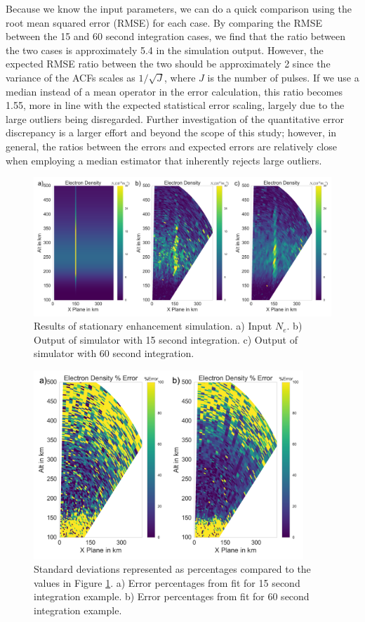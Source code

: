 \documentclass[draft,ras]{agutex}
\begin{document}
\begin{article}
Because we know the input parameters, we can do a quick comparison using the root mean squared error (RMSE) for each case. By comparing the RMSE between the 15 and 60 second integration cases, we find that the ratio between the two cases is approximately 5.4 in the simulation output.  However, the expected RMSE ratio between the two should be approximately 2 since the variance of the ACFs scales as $1/\sqrt{J}$, where $J$ is the number of pulses. If we use a median instead of a mean operator in the error calculation, this ratio becomes 1.55, more in line with the expected statistical error scaling, largely due to the large outliers being disregarded.  Further investigation of the quantitative error discrepancy is a larger effort and beyond the scope of this study; however, in general, the ratios between the errors and expected errors are relatively close when employing a median estimator that inherently rejects large outliers.

\begin{figure}[!t]
\centering
\includegraphics[width=6in]{stationary}
\caption{Results of stationary enhancement simulation. a) Input $N_e$. b) Output of simulator with 15 second integration. c) Output of simulator with 60 second integration.}
\label{fig:stationaryall}
\end{figure}

\begin{figure}[!t]
\centering
\includegraphics[width=4in]{Errorstationary}
\caption{Standard deviations represented as percentages compared to the values in Figure \ref{fig:stationaryall}. a)  Error percentages from fit for 15 second integration example. b) Error percentages from fit for 60 second integration example.}
\label{fig:errorstationaryall}
\end{figure}


\end{article}
\end{document}
